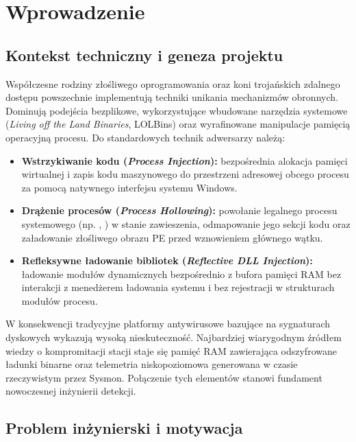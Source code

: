 \chapter{Wprowadzenie}\label{ch:wprowadzenie}

\section{Kontekst techniczny i geneza projektu}\label{sec:kontekst_technologiczny}

Współczesne rodziny złośliwego oprogramowania oraz koni trojańskich zdalnego dostępu powszechnie implementują techniki unikania mechanizmów obronnych. Dominują podejścia bezplikowe, wykorzystujące wbudowane narzędzia systemowe (\textit{Living off the Land Binaries}, LOLBins) oraz wyrafinowane manipulacje pamięcią operacyjną procesu. Do standardowych technik adwersarzy należą:
\begin{itemize}
    \item \textbf{Wstrzykiwanie kodu (\textit{Process Injection}):} bezpośrednia alokacja pamięci wirtualnej i zapis kodu maszynowego do przestrzeni adresowej obcego procesu za pomocą natywnego interfejsu systemu Windows.
    \item \textbf{Drążenie procesów (\textit{Process Hollowing}):} powołanie legalnego procesu systemowego (np. , ) w stanie zawieszenia, odmapowanie jego sekcji kodu oraz załadowanie złośliwego obrazu PE przed wznowieniem głównego wątku.
    \item \textbf{Refleksywne ładowanie bibliotek (\textit{Reflective DLL Injection}):} ładowanie modułów dynamicznych bezpośrednio z bufora pamięci RAM bez interakcji z menedżerem ładowania systemu i bez rejestracji w strukturach modułów procesu.
\end{itemize}

W konsekwencji tradycyjne platformy antywirusowe bazujące na sygnaturach dyskowych wykazują wysoką nieskuteczność. Najbardziej wiarygodnym źródłem wiedzy o kompromitacji stacji staje się pamięć RAM zawierająca odszyfrowane ładunki binarne oraz telemetria niskopoziomowa generowana w czasie rzeczywistym przez Sysmon. Połączenie tych elementów stanowi fundament nowoczesnej inżynierii detekcji.

\section{Problem inżynierski i motywacja}\label{sec:problem_badawczy}

